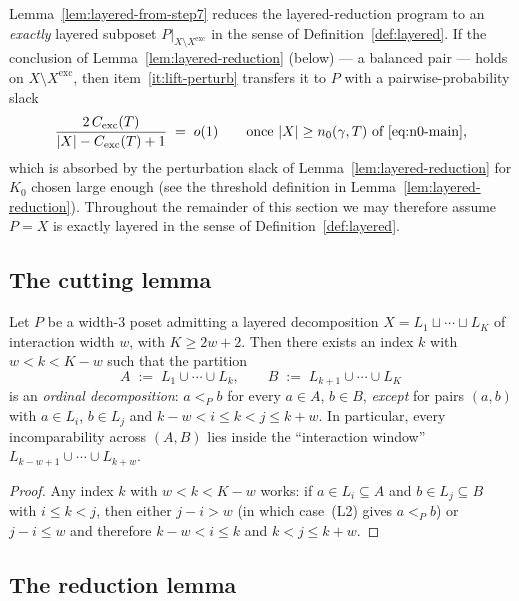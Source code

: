 \begin{remark}
\label{rem:layered-exact-assumption}
Lemma~\ref{lem:layered-from-step7} reduces the layered-reduction
program to an \emph{exactly} layered subposet
$P|_{X \setminus X^{\mathrm{exc}}}$ in the sense of
Definition~\ref{def:layered}.  If the conclusion of
Lemma~\ref{lem:layered-reduction} (below) — a balanced pair —
holds on $X \setminus X^{\mathrm{exc}}$, then
item~\ref{it:lift-perturb} transfers it to $P$ with a
pairwise-probability slack
\[
  \frac{2\,C_{\mathrm{exc}}(T)}{|X| - C_{\mathrm{exc}}(T) + 1}
  \;=\; o(1)
  \qquad \text{once $|X| \ge n_0(\gamma, T)$ of~\eqref{eq:n0-main},}
\]
which is absorbed by the perturbation slack of
Lemma~\ref{lem:layered-reduction} for $K_0$ chosen large enough
(see the threshold definition in
Lemma~\ref{lem:layered-reduction}).  Throughout the remainder of
this section we may therefore assume $P = X$ is exactly layered in
the sense of Definition~\ref{def:layered}.
\end{remark}

\subsection{The cutting lemma}

\begin{lemma}\label{lem:cut}
Let $P$ be a width-$3$ poset admitting a layered decomposition
$X = L_1 \sqcup \cdots \sqcup L_K$ of interaction width $w$, with
$K \ge 2w + 2$. Then there exists an index $k$ with $w < k < K - w$
such that the partition
\[
  A \;:=\; L_1 \cup \cdots \cup L_k,
  \qquad
  B \;:=\; L_{k+1} \cup \cdots \cup L_K
\]
is an \emph{ordinal decomposition}: $a <_P b$ for every $a \in A$,
$b \in B$, \emph{except} for pairs $(a,b)$ with $a \in L_i$, $b \in L_j$
and $k - w < i \le k < j \le k + w$. In particular, every
incomparability across $(A,B)$ lies inside the ``interaction window''
$L_{k-w+1} \cup \cdots \cup L_{k+w}$.
\end{lemma}

\begin{proof}
Any index $k$ with $w < k < K - w$ works: if $a \in L_i \subseteq A$
and $b \in L_j \subseteq B$ with $i \le k < j$, then either
$j - i > w$ (in which case~(L2) gives $a <_P b$) or $j - i \le w$ and
therefore $k - w < i \le k$ and $k < j \le k + w$.
\end{proof}

\subsection{The reduction lemma}

